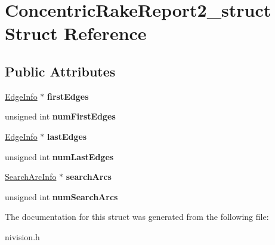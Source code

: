 \hypertarget{structConcentricRakeReport2__struct}{
\section{ConcentricRakeReport2\_\-struct Struct Reference}
\label{structConcentricRakeReport2__struct}
}
\subsection*{Public Attributes}
\begin{DoxyCompactItemize}
\item 
\hypertarget{structConcentricRakeReport2__struct_a15ccf386cbd51efa0870066fc1e407c8}{
\hyperlink{structEdgeInfo__struct}{EdgeInfo} $\ast$ {\bfseries firstEdges}}
\label{structConcentricRakeReport2__struct_a15ccf386cbd51efa0870066fc1e407c8}

\item 
\hypertarget{structConcentricRakeReport2__struct_add55befce798755f1cdf2d28df77b418}{
unsigned int {\bfseries numFirstEdges}}
\label{structConcentricRakeReport2__struct_add55befce798755f1cdf2d28df77b418}

\item 
\hypertarget{structConcentricRakeReport2__struct_a18df492087e5545d4c81652c89fb916e}{
\hyperlink{structEdgeInfo__struct}{EdgeInfo} $\ast$ {\bfseries lastEdges}}
\label{structConcentricRakeReport2__struct_a18df492087e5545d4c81652c89fb916e}

\item 
\hypertarget{structConcentricRakeReport2__struct_a2b8d26147e82b10efedddb3b82bcb018}{
unsigned int {\bfseries numLastEdges}}
\label{structConcentricRakeReport2__struct_a2b8d26147e82b10efedddb3b82bcb018}

\item 
\hypertarget{structConcentricRakeReport2__struct_aab81e505c0b516a9d2b63577292a2a71}{
\hyperlink{structSearchArcInfo__struct}{SearchArcInfo} $\ast$ {\bfseries searchArcs}}
\label{structConcentricRakeReport2__struct_aab81e505c0b516a9d2b63577292a2a71}

\item 
\hypertarget{structConcentricRakeReport2__struct_a4268ee05d53170df3860f9d8087ef7bb}{
unsigned int {\bfseries numSearchArcs}}
\label{structConcentricRakeReport2__struct_a4268ee05d53170df3860f9d8087ef7bb}

\end{DoxyCompactItemize}


The documentation for this struct was generated from the following file:\begin{DoxyCompactItemize}
\item 
nivision.h\end{DoxyCompactItemize}
